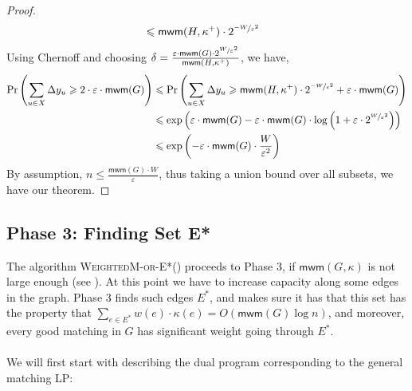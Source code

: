\documentclass[a4paper,11pt]{article}
\DeclareMathOperator*{\Prob}{\ensuremath{\textnormal{Pr}}}
\renewcommand{\Pr}{\Prob}
\newcommand{\prob}[1]{\Pr\paren{#1}}
\newcommand{\paren}[1]{\left ( #1 \right )}
\newcommand{\eps}{\varepsilon}
\theoremstyle{definition}
\theoremstyle{definition}
\theoremstyle{definition}
\theoremstyle{definition}
\theoremstyle{definition}
\theoremstyle{definition}
\theoremstyle{definition}
\theoremstyle{definition}
\theoremstyle{definition}
\theoremstyle{definition}
\theoremstyle{definition}
\theoremstyle{definition}
\theoremstyle{definition}
\theoremstyle{definition}
\theoremstyle{definition}
\begin{document}
\begin{proof}
\begin{align*}
						   &\leqslant \textsf{mwm}(H,\kappa^{+})\cdot 2^{\nicefrac{-W}{\eps^2}}
\end{align*}
Using Chernoff and choosing $\delta = \frac{\eps\cdot \textsf{mwm}(G)\cdot 2^{\nicefrac{W}{\eps^2}}}{\textsf{mwm}(H,\kappa^+)}$, we have,
\begin{align*}
\prob{\sum_{u\in X}\Delta y_u\geqslant 2\cdot \eps\cdot \textsf{mwm}(G)}&\leqslant \prob{\sum_{u\in X}\Delta y_u\geqslant \textsf{mwm}(H,\kappa^{+})\cdot 2^{\nicefrac{-W}{\eps^2}}+\varepsilon\cdot \textsf{mwm}(G)}\\
&\leqslant \exp\paren{\eps\cdot \textsf{mwm}(G) -\eps\cdot \textsf{mwm}(G) \cdot \log \paren{1+\eps\cdot 2^{\nicefrac{W}{\eps^2}}}}\\
&\leqslant \exp\paren{-\eps\cdot \textsf{mwm}(G)\cdot \frac{W}{\eps^2}}
\end{align*}
By assumption, $n\leqslant \frac{\textsf{mwm}(G)\cdot W}{\eps}$, thus taking a union bound over all subsets, we have our theorem.
\end{proof}

\subsection{Phase 3: Finding Set E*}

The algorithm \textsc{WeightedM-or-E*}() proceeds to Phase 3, if $\textsf{mwm}(G,\kappa)$ is not large enough (see ). At this point we have to increase capacity along some edges in the graph. Phase 3 finds such edges $E^*$, and makes sure it has that this set has the property that $\sum_{e\in E^*}w(e)\cdot \kappa(e)=O(\textsf{mwm}(G)\log n)$, and moreover, every good matching in $G$ has significant weight going through $E^*$. \\ \\
We will first start with describing the dual program corresponding to the general matching LP:
\end{document}
